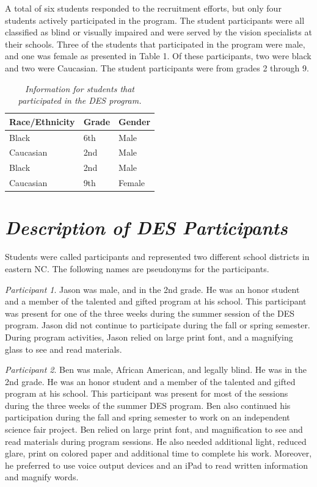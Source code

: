 \documentclass[11pt]{sig-alternate}
\begin{document}
\begin{large}
A total of six students responded to the recruitment efforts, but only four students actively participated in the program. The student participants were all classified as blind or visually impaired and were served by the vision specialists at their schools. Three of the students that participated in the program were male, and one was female as presented in Table 1. Of these participants, two were black and two were Caucasian. The student participants were from grades 2 through 9.

\begin{table}[]
\caption{\textit{Information for students that participated in the DES program.}}
\label{tab:my-table}
\begin{tabular}{|l|l|l|}
\hline
Race/Ethnicity & Grade & Gender \\ \hline
Black          & 6th   & Male   \\ \hline
Caucasian      & 2nd   & Male   \\ \hline
Black          & 2nd   & Male   \\ \hline
Caucasian      & 9th   & Female \\ \hline
\end{tabular}
\end{table}

\section*{\textit{Description of DES Participants}}
 
Students were called participants and represented two different school districts in eastern NC. The following names are pseudonyms for the participants.  

\textit{Participant 1}. Jason was male, and in the 2nd grade. He was an honor student and a member of the talented and gifted program at his school. This participant was present for one of the three weeks during the summer session of the DES program. Jason did not continue to participate during the fall or spring semester.  During program activities, Jason relied on large print font, and a magnifying glass to see and read materials.

\textit{Participant 2}. Ben was male, African American, and legally blind. He was in the 2nd grade. He was an honor student and a member of the talented and gifted program at his school. This participant was present for most of the sessions during the three weeks of the summer DES program.  Ben also continued his participation during the fall and spring semester to work on an independent science fair project.  Ben relied on large print font, and magnification to see and read materials during program sessions. He also needed additional light, reduced glare, print on colored paper and additional time to complete his work. Moreover, he preferred to use voice output devices and an iPad to read written information and magnify words.


\end{large}
\end{document}

